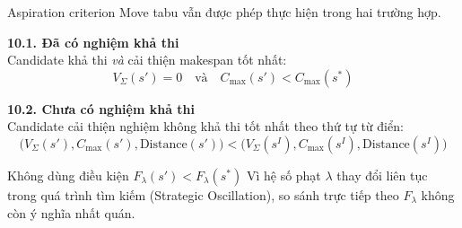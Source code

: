 \documentclass[aspectratio=169]{beamer}
\begin{document}
\begin{frame}{Aspiration criterion}
  \small Move tabu vẫn được phép thực hiện trong hai trường hợp.

  \vspace{2mm}
  \textbf{10.1. Đã có nghiệm khả thi}\\
  \small Candidate khả thi \emph{và} cải thiện makespan tốt nhất:
  $$V_\Sigma(s') = 0 \quad \text{và} \quad C_{\max}(s') < C_{\max}(s^*)$$

  \vspace{2mm}
  \textbf{10.2. Chưa có nghiệm khả thi}\\
  \small Candidate cải thiện nghiệm không khả thi tốt nhất theo thứ tự từ điển:
  $$\big(V_\Sigma(s'), C_{\max}(s'), \text{Distance}(s')\big) < \big(V_\Sigma(s^I), C_{\max}(s^I), \text{Distance}(s^I)\big)$$

  \vspace{2mm}
  \begin{alertblock}{Không dùng điều kiện $F_\lambda(s') < F_\lambda(s^*)$}
    \small Vì hệ số phạt $\lambda$ thay đổi liên tục trong quá trình tìm kiếm (Strategic Oscillation), so sánh trực tiếp theo $F_\lambda$ không còn ý nghĩa nhất quán.
  \end{alertblock}
\end{frame}

\end{document}
